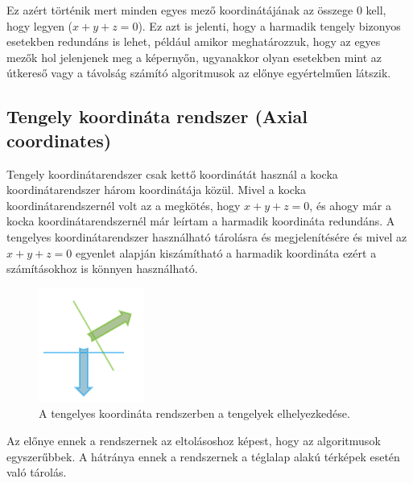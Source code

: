 \noindent Ez azért történik mert minden egyes mező koordinátájának az összege $0$ kell, hogy legyen ($x + y + z = 0$). Ez azt is jelenti, hogy a harmadik tengely bizonyos esetekben redundáns is lehet, például amikor meghatározzuk, hogy az egyes mezők hol jelenjenek meg a képernyőn, ugyanakkor olyan esetekben mint az útkereső vagy a távolság számító algoritmusok az előnye egyértelműen látszik. 

\subsection{Tengely koordináta rendszer (Axial coordinates)}

Tengely koordinátarendszer csak kettő koordinátát használ a kocka koordinátarendszer három koordinátája közül. Mivel a kocka koordinátarendszernél volt az a megkötés, hogy $x + y + z = 0$, és ahogy már a kocka koordinátarendszernél már leírtam a harmadik koordináta redundáns.  A tengelyes koordinátarendszer használható tárolásra és megjelenítésére és mivel az $x + y + z = 0$ egyenlet alapján kiszámítható a harmadik koordináta ezért a számításokhoz is könnyen használható.

\begin{figure}[h]
\centering
\includegraphics[scale=0.5]{kepek/img46.png}
\caption{A tengelyes koordináta rendszerben a tengelyek elhelyezkedése.}
\label{fig:img46}
\end{figure}

\noindent Az előnye ennek a rendszernek az eltolásoshoz képest, hogy az algoritmusok egyszerűbbek. A hátránya ennek a rendszernek a téglalap alakú térképek esetén való tárolás. 
